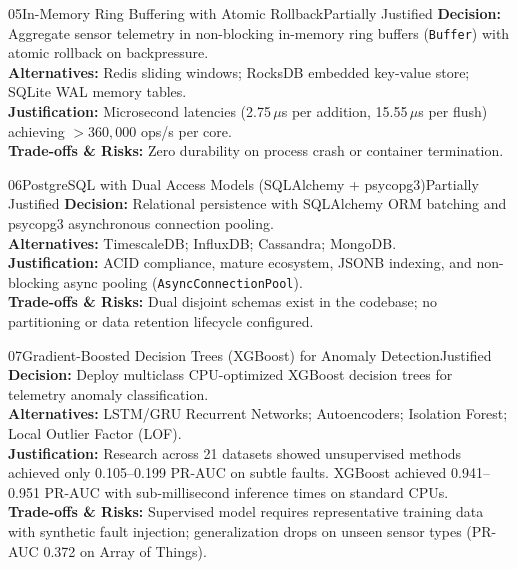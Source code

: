 \documentclass[10pt,a4paper]{report}
\begin{document}
\begin{adrbox}{05}{In-Memory Ring Buffering with Atomic Rollback}{Partially Justified}
\textbf{Decision:} Aggregate sensor telemetry in non-blocking in-memory ring buffers (\texttt{Buffer}) with atomic rollback on backpressure.\\
\textbf{Alternatives:} Redis sliding windows; RocksDB embedded key-value store; SQLite WAL memory tables.\\
\textbf{Justification:} Microsecond latencies (2.75\,$\mu$s per addition, 15.55\,$\mu$s per flush) achieving $>360,000$ ops/s per core.\\
\textbf{Trade-offs \& Risks:} Zero durability on process crash or container termination.
\end{adrbox}

\begin{adrbox}{06}{PostgreSQL with Dual Access Models (SQLAlchemy + psycopg3)}{Partially Justified}
\textbf{Decision:} Relational persistence with SQLAlchemy ORM batching and psycopg3 asynchronous connection pooling.\\
\textbf{Alternatives:} TimescaleDB; InfluxDB; Cassandra; MongoDB.\\
\textbf{Justification:} ACID compliance, mature ecosystem, JSONB indexing, and non-blocking async pooling (\texttt{AsyncConnectionPool}).\\
\textbf{Trade-offs \& Risks:} Dual disjoint schemas exist in the codebase; no partitioning or data retention lifecycle configured.
\end{adrbox}

\begin{adrbox}{07}{Gradient-Boosted Decision Trees (XGBoost) for Anomaly Detection}{Justified}
\textbf{Decision:} Deploy multiclass CPU-optimized XGBoost decision trees for telemetry anomaly classification.\\
\textbf{Alternatives:} LSTM/GRU Recurrent Networks; Autoencoders; Isolation Forest; Local Outlier Factor (LOF).\\
\textbf{Justification:} Research across 21 datasets showed unsupervised methods achieved only 0.105--0.199 PR-AUC on subtle faults. XGBoost achieved 0.941--0.951 PR-AUC with sub-millisecond inference times on standard CPUs.\\
\textbf{Trade-offs \& Risks:} Supervised model requires representative training data with synthetic fault injection; generalization drops on unseen sensor types (PR-AUC 0.372 on Array of Things).
\end{adrbox}
\end{document}
